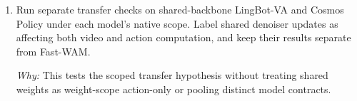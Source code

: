 \documentclass[10pt,a4paper]{article}
\begin{document}
\begin{enumerate}[leftmargin=*,start=5]
  \item Run separate transfer checks on shared-backbone LingBot-VA and Cosmos Policy under each model's native scope. Label shared denoiser updates as affecting both video and action computation, and keep their results separate from Fast-WAM.
\par\emph{Why:} This tests the scoped transfer hypothesis without treating shared weights as weight-scope action-only or pooling distinct model contracts.
\end{enumerate}
\end{document}
